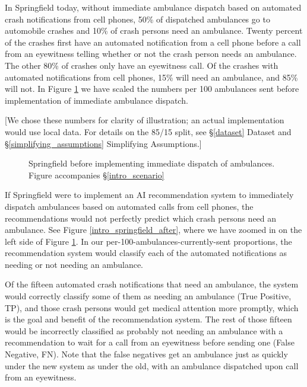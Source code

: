 In Springfield today, without immediate ambulance dispatch based on automated crash notifications from cell phones, 50\% of dispatched ambulances go to automobile crashes and 10\% of crash persons need an ambulance.  Twenty percent of the crashes first have an automated notification from a cell phone before a call from an eyewitness telling whether or not the crash person needs an ambulance.  The other 80\% of crashes only have an eyewitness call.  Of the crashes with automated notifications from cell phones, 15\% will need an ambulance, 
and 85\% will not. 
In Figure \ref{intro_springfield_before} we have scaled the numbers per 100 ambulances sent before implementation of immediate ambulance dispatch.  

[We chose these numbers for clarity of illustration; an actual implementation would use local data.  For details on the 85/15 split, see \S\ref{dataset} Dataset and \S\ref{simplifying_assumptions} Simplifying Assumptions.]

\begin{figure}[h]
	
\caption{\normalfont\normalsize Springfield before implementing immediate dispatch of ambulances.  Figure accompanies \S\ref{intro_scenario}}
\label{intro_springfield_before}
\end{figure}

\FloatBarrier

If Springfield were to implement an AI recommendation system to immediately dispatch ambulances based on automated calls from cell phones, the recommendations would not perfectly predict which crash persons need an ambulance.    See Figure \ref{intro_springfield_after}, where we have zoomed in on the left side of Figure \ref{intro_springfield_before}. In our per-100-ambulances-currently-sent proportions, the recommendation system would classify each of the automated notifications as needing or not needing an ambulance.  

Of the fifteen automated crash notifications that need an ambulance, the system would correctly classify some of them as needing an ambulance (True Positive, TP), and those crash persons would get medical attention more promptly, which is the goal and benefit of the recommendation system.  The rest of those fifteen would be incorrectly classified as probably not needing an ambulance with a recommendation to wait for a call from an eyewitness before sending one (False Negative, FN).  Note that the false negatives get an ambulance just as quickly under the new system as under the old,  with an ambulance dispatched upon call from an eyewitness.  

